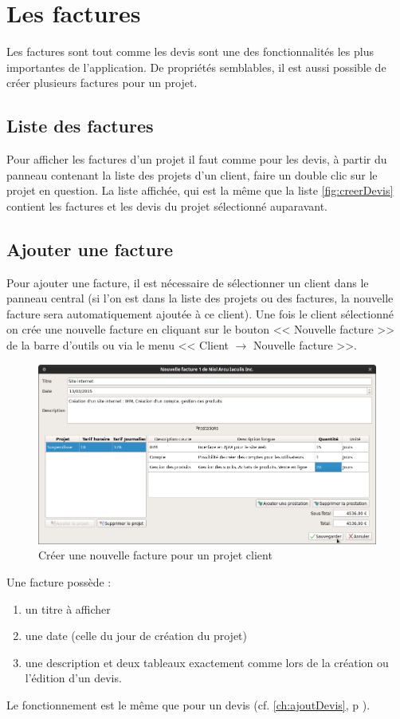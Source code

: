 \chapter{Les factures}
Les factures sont tout comme les devis sont une des fonctionnalités les plus importantes de l'application. De propriétés semblables, il est aussi possible de créer plusieurs factures pour un projet.
\section{Liste des factures}
Pour afficher les factures d'un projet il faut comme pour les devis, à partir du panneau contenant la liste des projets d'un client, faire un double clic sur le projet en question. La liste affichée, qui est la même que la liste \ref{fig:creerDevis} contient les factures et les devis du projet sélectionné auparavant.

\section{Ajouter une facture}
Pour ajouter une facture, il est nécessaire de sélectionner un client dans le panneau central (si l'on est dans la liste des projets ou des factures, la nouvelle facture sera automatiquement ajoutée à ce client). Une fois le client sélectionné on crée une nouvelle facture en cliquant sur le bouton << Nouvelle facture >> de la barre d'outils ou via le menu << Client $\rightarrow$ Nouvelle facture >>. 
\begin{figure}[H]
	\centering
	\includegraphics[width=17cm]{screens/creerFacture.png}
	\caption{Créer une nouvelle facture pour un projet client}
	\label{fig:creerFacture}
\end{figure}
Une facture possède :
\begin{enumerate}
	\item un titre à afficher
	\item une date (celle du jour de création du projet)
	\item une description et deux tableaux exactement comme lors de la création ou l'édition d'un devis.
\end{enumerate}	
 Le fonctionnement est le même que pour un devis (cf. \ref*{ch:ajoutDevis}, p \pageref{ch:Prestations}).

